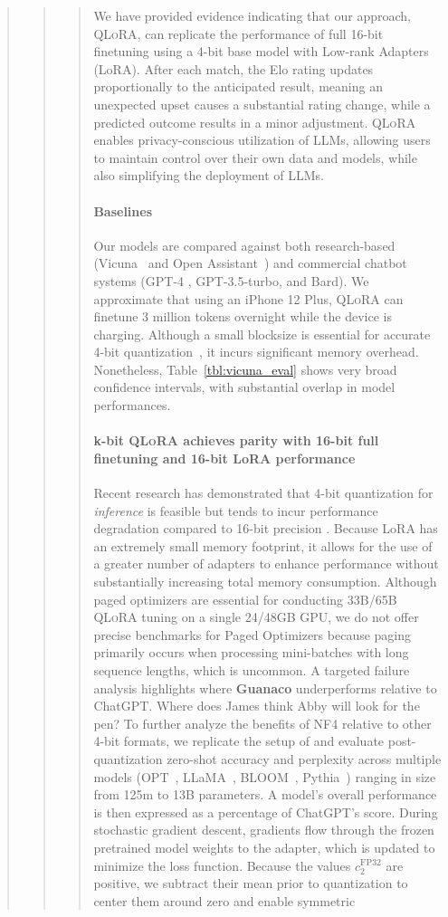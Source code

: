 \begin{quote}
\begin{quote}
{\begin{abstract}
{{We have provided evidence indicating that our approach, \textsc{QLoRA}, can replicate the performance of full 16-bit finetuning using a 4-bit base model with Low-rank Adapters (LoRA). After each match, the Elo rating updates proportionally to the anticipated result, meaning an unexpected upset causes a substantial rating change, while a predicted outcome results in a minor adjustment. \textsc{QLoRA} enables privacy-conscious utilization of LLMs, allowing users to maintain control over their own data and models, while also simplifying the deployment of LLMs. \paragraph{Baselines} Our models are compared against both research-based (Vicuna~\citep{vicuna2023} and Open Assistant~\citep{kopf2023openassistant}) and commercial chatbot systems (GPT-4 \citep{openai2023gpt}, GPT-3.5-turbo, and Bard). We approximate that using an iPhone 12 Plus, \textsc{QLoRA} can finetune 3 million tokens overnight while the device is charging. Although a small blocksize is essential for accurate 4-bit quantization~\citep{dettmers2022case}, it incurs significant memory overhead. Nonetheless, Table~\ref{tbl:vicuna_eval} shows very broad confidence intervals, with substantial overlap in model performances. \paragraph{k-bit \textsc{QLoRA} achieves parity with 16-bit full finetuning and 16-bit LoRA performance} Recent research has demonstrated that 4-bit quantization for \emph{inference} is feasible but tends to incur performance degradation compared to 16-bit precision \citep{dettmers2022case,frantar2022gptq}. Because LoRA has an extremely small memory footprint, it allows for the use of a greater number of adapters to enhance performance without substantially increasing total memory consumption. Although paged optimizers are essential for conducting 33B/65B \textsc{QLoRA} tuning on a single 24/48GB GPU, we do not offer precise benchmarks for Paged Optimizers because paging primarily occurs when processing mini-batches with long sequence lengths, which is uncommon. A targeted failure analysis highlights where \textbf{Guanaco} underperforms relative to ChatGPT. Where does James think Abby will look for the pen? To further analyze the benefits of NF4 relative to other 4-bit formats, we replicate the setup of \citet{dettmers2022case} and evaluate post-quantization zero-shot accuracy and perplexity across multiple models (OPT~\citep{zhang2022opt}, LLaMA~\citep{touvron2023llama}, BLOOM~\citep{scao2022bloom}, Pythia~\citep{biderman2023pythia}) ranging in size from 125m to 13B parameters. A model's overall performance is then expressed as a percentage of ChatGPT's score. During stochastic gradient descent, gradients flow through the frozen pretrained model weights to the adapter, which is updated to minimize the loss function. Because the values $c_2^{\text{FP32}}$ are positive, we subtract their mean prior to quantization to center them around zero and enable symmetric }}
\end{abstract}}
\end{quote}
\end{quote}
